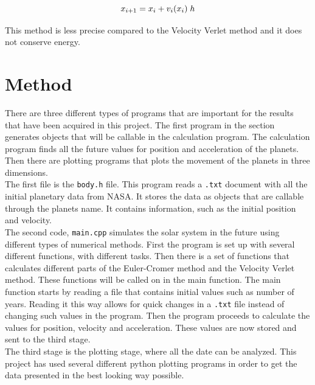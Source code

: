 \documentclass{article}
\begin{document}
    \begin{equation}    \label{eq:Eposition}
        x_{i+1} = x_i +  v_{i}(x_i) \; h \\
    \end{equation}

    This method is less precise compared to the Velocity Verlet method and it does not conserve energy. \\


\vspace{1cm}

\section{Method} \label{sec:Method}

    There are three different types of programs that are important for the results that have been acquired in this project. The first program in the section generates objects that will be callable in the calculation program. The calculation program finds all the future values for position and acceleration of the planets. Then there are plotting programs that plots the movement of the planets in three dimensions. \\

    The first file is the \texttt{body.h} file. This program reads a \texttt{.txt} document with all the initial planetary data from NASA. It stores the data as objects that are callable through the planets name. It contains information, such as the initial position and velocity. \\

    The second code, \texttt{main.cpp} simulates the solar system in the future using different types of numerical methods. First the program is set up with several different functions, with different tasks. Then there is a set of functions that calculates different parts of the Euler-Cromer method and the Velocity Verlet method. These functions will be called on in the main function. The main function starts by reading a file that contains initial values such as number of years. Reading it this way allows for quick changes in a \texttt{.txt} file instead of changing such values in the program. Then the program proceeds to calculate the values for position, velocity and acceleration. These values are now stored and sent to the third stage. \\

    The third stage is the plotting stage, where all the date can be analyzed. This project has used several different python plotting programs in order to get the data presented in the best looking way possible. \\
\end{document}

